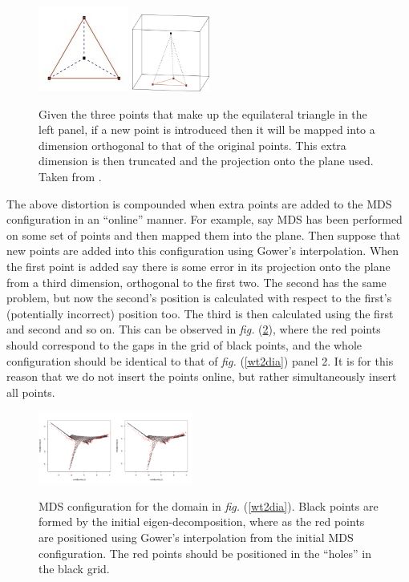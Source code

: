 \documentclass[a4paper,10pt]{amsart}
\newcommand{\fig}[1]{\emph{fig.} (\ref{#1})}
\begin{document}
\begin{figure}
\centering
\includegraphics{figs/boj0.jpg} \includegraphics[width=1in]{figs/boj1.jpg} \\
\caption{Given the three points that make up the equilateral triangle in the left panel, if a new point is introduced then it will be mapped into a dimension orthogonal to that of the original points. This extra dimension is then truncated and the projection onto the plane used. Taken from \cite{Boj2009}.}
\label{bojinsert}
\end{figure}

The above distortion is compounded when extra points are added to the MDS configuration in an ``online'' manner. For example, say MDS has been performed on some set of points and then mapped them into the plane. Then suppose that new points are added into this configuration using Gower's interpolation. When the first point is added say there is some error in its projection onto the plane from a third dimension, orthogonal to the first two. The second has the same problem, but now the second's position is calculated with respect to the first's (potentially incorrect) position too. The third is then calculated using the first and second and so on. This can be observed in \fig{gowererror}, where the red points should correspond to the gaps in the grid of black points, and the whole configuration should be identical to that of \fig{wt2dia} panel 2. It is for this reason that we do not insert the points online, but rather simultaneously insert all points.

\begin{figure}
\centering
\includegraphics[width=2in]{figs/gowererror.pdf} \\
\caption{MDS configuration for the domain in \fig{wt2dia}. Black points are formed by the initial eigen-decomposition, where as the red points are positioned using Gower's interpolation from the initial MDS configuration. The red points should be positioned in the ``holes'' in the black grid.}
\label{gowererror}
\end{figure}
\end{document}
